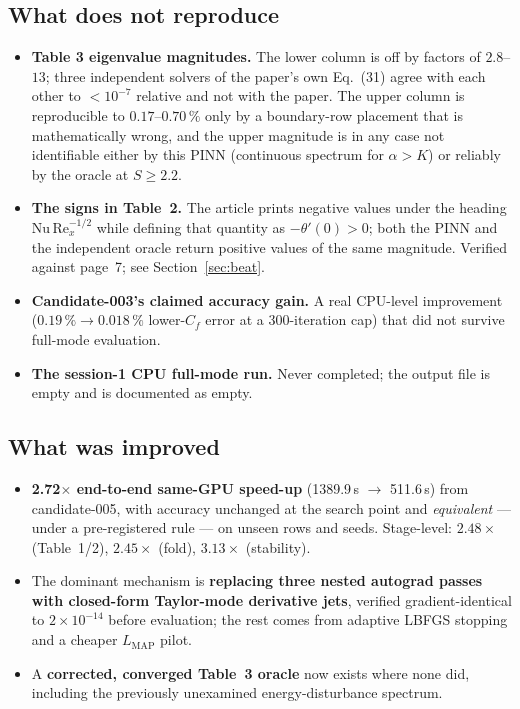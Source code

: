 \documentclass[11pt,a4paper]{article}
\newcommand{\pct}{\,\%}
\begin{document}
\subsection{What does not reproduce}
\begin{itemize}[leftmargin=1.4em,itemsep=1pt]
  \item \textbf{Table 3 eigenvalue magnitudes.} The lower column is off by factors of
        $2.8$--$13$; three independent solvers of the paper's own Eq.~(31) agree with each
        other to $<10^{-7}$ relative and not with the paper. The upper column is
        reproducible to $0.17$--$0.70\pct$ only by a boundary-row placement that is
        mathematically wrong, and the upper magnitude is in any case not identifiable
        either by this PINN (continuous spectrum for $\alpha>K$) or reliably by the oracle
        at $S\geq2.2$.
  \item \textbf{The signs in Table~2.} The article prints negative values under the heading
        $\mathrm{Nu}\,\mathrm{Re}_x^{-1/2}$ while defining that quantity as $-\theta'(0)>0$;
        both the PINN and the independent oracle return positive values of the same
        magnitude. Verified against page~7; see Section~\ref{sec:beat}.
  \item \textbf{Candidate-003's claimed accuracy gain.} A real CPU-level improvement
        ($0.19\pct\to0.018\pct$ lower-$C_f$ error at a 300-iteration cap) that did not
        survive full-mode evaluation.
  \item \textbf{The session-1 CPU full-mode run.} Never completed; the output file is empty
        and is documented as empty.
\end{itemize}

\subsection{What was improved}
\begin{itemize}[leftmargin=1.4em,itemsep=1pt]
  \item \textbf{2.72$\times$ end-to-end same-GPU speed-up} (1389.9\,s $\to$ 511.6\,s) from
        candidate-005, with accuracy unchanged at the search point and
        \emph{equivalent} --- under a pre-registered rule --- on unseen rows and seeds.
        Stage-level: $2.48\times$ (Table~1/2), $2.45\times$ (fold), $3.13\times$
        (stability).
  \item The dominant mechanism is \textbf{replacing three nested autograd passes with
        closed-form Taylor-mode derivative jets}, verified gradient-identical to
        $2\times10^{-14}$ before evaluation; the rest comes from adaptive LBFGS stopping and
        a cheaper $L_{\mathrm{MAP}}$ pilot.
  \item A \textbf{corrected, converged Table~3 oracle} now exists where none did, including
        the previously unexamined energy-disturbance spectrum.
\end{itemize}
\end{document}
